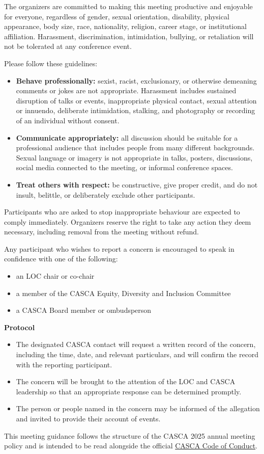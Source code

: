 
The organizers are committed to making this meeting productive and enjoyable for
everyone, regardless of gender, sexual orientation, disability, physical appearance,
body size, race, nationality, religion, career stage, or institutional affiliation.
Harassment, discrimination, intimidation, bullying, or retaliation will not be
tolerated at any conference event.

Please follow these guidelines:

\begin{itemize}
  \item \textbf{Behave professionally:} sexist, racist, exclusionary, or otherwise
  demeaning comments or jokes are not appropriate. Harassment includes sustained
  disruption of talks or events, inappropriate physical contact, sexual attention
  or innuendo, deliberate intimidation, stalking, and photography or recording of
  an individual without consent.
  \item \textbf{Communicate appropriately:} all discussion should be suitable for a
  professional audience that includes people from many different backgrounds.
  Sexual language or imagery is not appropriate in talks, posters, discussions,
  social media connected to the meeting, or informal conference spaces.
  \item \textbf{Treat others with respect:} be constructive, give proper credit,
  and do not insult, belittle, or deliberately exclude other participants.
\end{itemize}

Participants who are asked to stop inappropriate behaviour are expected to comply
immediately. Organizers reserve the right to take any action they deem necessary,
including removal from the meeting without refund.

Any participant who wishes to report a concern is encouraged to speak in
confidence with one of the following:

\begin{itemize}
  \item an LOC chair or co-chair
  \item a member of the CASCA Equity, Diversity and Inclusion Committee
  \item a CASCA Board member or ombudsperson
\end{itemize}

\textbf{Protocol}

\begin{itemize}
  \item The designated CASCA contact will request a written record of the concern,
  including the time, date, and relevant particulars, and will confirm the record
  with the reporting participant.
  \item The concern will be brought to the attention of the LOC and CASCA
  leadership so that an appropriate response can be determined promptly.
  \item The person or people named in the concern may be informed of the allegation
  and invited to provide their account of events.
\end{itemize}

This meeting guidance follows the structure of the CASCA 2025 annual meeting
policy and is intended to be read alongside the official
\href{https://casca.ca/?page_id=22442}{CASCA Code of Conduct}.